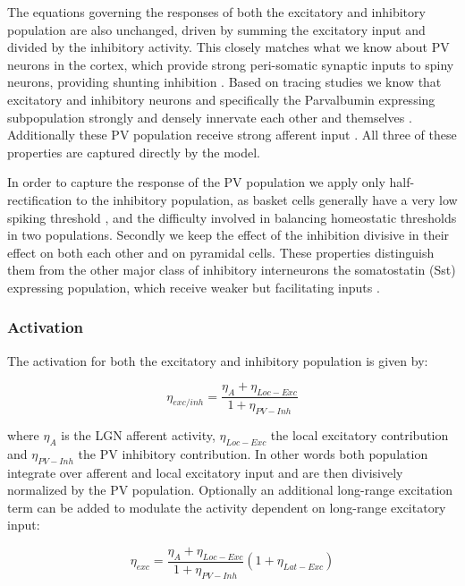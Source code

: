 The equations governing the responses of both the excitatory and
inhibitory population are also unchanged, driven by summing the
excitatory input and divided by the inhibitory activity. This closely
matches what we know about PV neurons in the cortex, which provide
strong peri-somatic synaptic inputs to spiny neurons, providing
shunting inhibition \citep{Atallah2012, Wilson2012}. Based on tracing
studies we know that excitatory and inhibitory neurons and
specifically the Parvalbumin expressing subpopulation strongly and
densely innervate each other and themselves \citep{Buzas2001, Ma2011,
  Pfeffer2013}. Additionally these PV population receive strong
afferent input \citep{Burkhalter2008}. All three of these properties
are captured directly by the model.

In order to capture the response of the PV population we apply only
half-rectification to the inhibitory population, as basket cells
generally have a very low spiking threshold \citep{Ma2011}, and the
difficulty involved in balancing homeostatic thresholds in two
populations. Secondly we keep the effect of the inhibition divisive in
their effect on both each other and on pyramidal cells. These
properties distinguish them from the other major class of inhibitory
interneurons the somatostatin (Sst) expressing population, which
receive weaker but facilitating inputs
\citep{Beierlein2003,Bartley2008,Tan2008}.

\subsubsection{Activation}

The activation for both the excitatory and inhibitory population is
given by:

\begin{equation}
  \eta_{exc/inh} = \frac{\eta_{A} + \eta_{Loc-Exc}}{1 + \eta_{PV-Inh}}
\end{equation}

where $\eta_{A}$ is the LGN afferent activity, $\eta_{Loc-Exc}$ the
local excitatory contribution and $\eta_{PV-Inh}$ the PV inhibitory
contribution. In other words both population integrate over afferent
and local excitatory input and are then divisively normalized by the
PV population. Optionally an additional long-range excitation term can
be added to modulate the activity dependent on long-range excitatory
input:

\begin{equation}
  \eta_{exc} = \frac{\eta_{A} + \eta_{Loc-Exc}}{1 + \eta_{PV-Inh}} (1+\eta_{Lat-Exc})
\end{equation}

